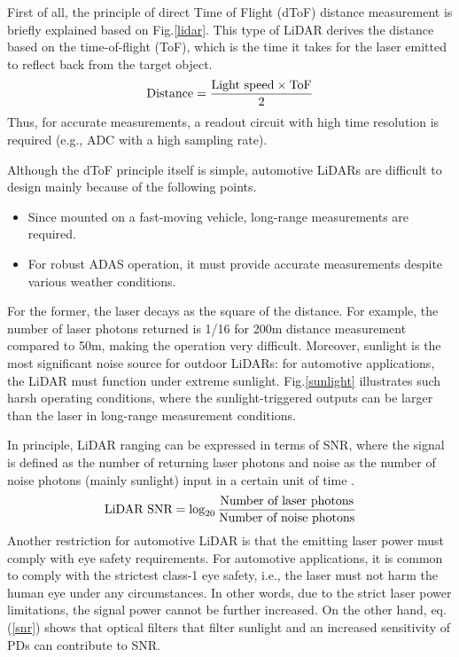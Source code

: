 \documentclass[paper]{ieice}
\begin{document}
\qquad First of all, the principle of direct Time of Flight (dToF) distance measurement is briefly explained based on Fig.\ref{lidar}. This type of LiDAR derives the distance based on the time-of-flight  (ToF), which is the time it takes for the laser emitted to reflect back from the target object.
\begin{eqnarray}
    \centering
    \textrm{Distance} = \frac{\textrm{Light speed} \times \textrm{ToF}}{2}
    \label{dist}
\end{eqnarray}
Thus, for accurate measurements, a readout circuit with high time resolution is required (e.g., ADC with a high sampling rate).

Although the dToF principle itself is simple, automotive LiDARs are difficult to design mainly because of the following points. 
\begin{itemize}
\item Since mounted on a fast-moving vehicle, long-range measurements are required.
\item For robust ADAS operation, it must provide accurate measurements despite various weather conditions.
\end{itemize}
For the former, the laser decays as the square of the distance. For example, the number of laser photons returned is 1/16 for 200m distance measurement compared to 50m, making the operation very difficult. Moreover, sunlight is the most significant noise source for outdoor LiDARs: for automotive applications, the LiDAR must function under extreme sunlight. Fig.\ref{sunlight} illustrates such harsh operating conditions, where the sunlight-triggered outputs can be larger than the laser in long-range measurement conditions.

In principle, LiDAR ranging can be expressed in terms of SNR, where the signal is defined as the number of returning laser photons and noise as the number of noise photons (mainly sunlight) input in a certain unit of time \cite{yoshioka201820}.
\begin{eqnarray}
    \centering
    \textrm{LiDAR SNR} = \log_{20}{\frac{\textrm{Number of laser photons}}{\textrm{Number of noise photons}}}
    \label{snr}
\end{eqnarray}
Another restriction for automotive LiDAR is that the emitting laser power must comply with eye safety requirements. For automotive applications, it is common to comply with the strictest class-1 eye safety, i.e., the laser must not harm the human eye under any circumstances. In other words, due to the strict laser power limitations, the signal power cannot be further increased. On the other hand, eq.(\ref{snr}) shows that optical filters that filter sunlight and an increased sensitivity of PDs can contribute to SNR.
\end{document}
